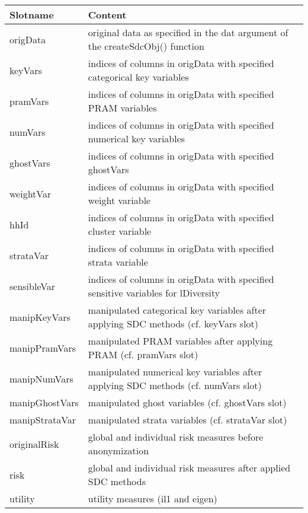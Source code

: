 \documentclass[letterpaper,10pt,english]{sphinxmanual}
\begin{document}
\begin{savenotes}\sphinxattablestart
\centering
{}
\label{\detokenize{sdcMicro:tab72}}\label{\detokenize{sdcMicro:id11}}
\sphinxaftercaption
\begin{tabulary}{\linewidth}[t]{|T|T|}
\hline
\sphinxstyletheadfamily 
Slotname
&\sphinxstyletheadfamily 
Content
\\
\hline
origData
&
original data as specified in the
dat argument of the
createSdcObj() function
\\
\hline
keyVars
&
indices of columns in origData
with specified categorical key
variables
\\
\hline
pramVars
&
indices of columns in origData
with specified PRAM variables
\\
\hline
numVars
&
indices of columns in origData
with specified numerical key
variables
\\
\hline
ghostVars
&
indices of columns in origData
with specified ghostVars
\\
\hline
weightVar
&
indices of columns in origData
with specified weight variable
\\
\hline
hhId
&
indices of columns in origData
with specified cluster variable
\\
\hline
strataVar
&
indices of columns in origData
with specified strata variable
\\
\hline
sensibleVar
&
indices of columns in origData
with specified sensitive
variables for lDiversity
\\
\hline
manipKeyVars
&
manipulated categorical key
variables after applying SDC
methods (cf. keyVars slot)
\\
\hline
manipPramVars
&
manipulated PRAM variables after
applying PRAM (cf. pramVars slot)
\\
\hline
manipNumVars
&
manipulated numerical key
variables after applying SDC
methods (cf. numVars slot)
\\
\hline
manipGhostVars
&
manipulated ghost variables (cf.
ghostVars slot)
\\
\hline
manipStrataVar
&
manipulated strata variables (cf.
strataVar slot)
\\
\hline
originalRisk
&
global and individual risk
measures before anonymization
\\
\hline
risk
&
global and individual risk
measures after applied SDC
methods
\\
\hline
utility
&
utility measures (il1 and eigen)
\\

\end{tabulary}
\end{savenotes}
\end{document}
